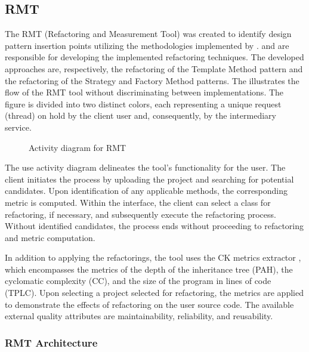 \subsection{RMT}
\label{sub-rmt}

The RMT (Refactoring and Measurement Tool) was created to identify design pattern insertion points utilizing the methodologies implemented by \textcite{beluzzo2018abordagem}. \textcite{zafeiris2017automated} and \textcite{Liu2014} are responsible for developing the implemented refactoring techniques. The developed approaches are, respectively, the refactoring of the Template Method pattern and the refactoring of the Strategy and Factory Method patterns. The  illustrates the flow of the RMT tool without discriminating between implementations. The figure is divided into two distinct colors, each representing a unique request (thread) on hold by the client user and, consequently, by the intermediary service.

\begin{figure}[ht!]
\SetCaptionWidth{\textwidth}
\caption{Activity diagram for RMT}
\label{fig-activity-rmt}
\fontsize{3.8}{5}\selectfont

\end{figure}
\FloatBarrier

The use activity diagram delineates the tool's functionality for the user. The client initiates the process by uploading the project and searching for potential candidates. Upon identification of any applicable methods, the corresponding metric is computed. Within the interface, the client can select a class for refactoring, if necessary, and subsequently execute the refactoring process. Without identified candidates, the process ends without proceeding to refactoring and metric computation.

In addition to applying the refactorings, the tool uses the CK metrics extractor \cite{ck}, which encompasses the metrics of the depth of the inheritance tree (PAH), the cyclomatic complexity (CC), and the size of the program in lines of code (TPLC). Upon selecting a project selected for refactoring, the metrics are applied to demonstrate the effects of refactoring on the user source code. The available external quality attributes are maintainability, reliability, and reusability.

\subsubsection{RMT Architecture}
\label{sub-architecture}

